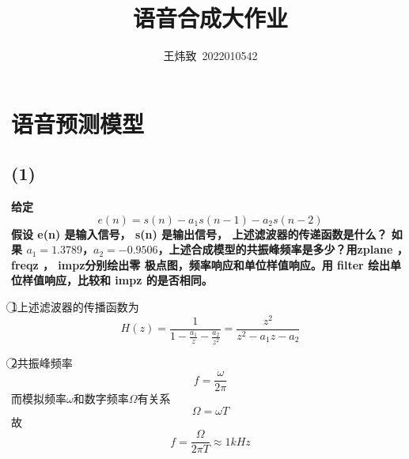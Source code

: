 \documentclass[10pt]{article}
\title{语音合成大作业}
\author{王炜致\ 2022010542}
\date{}
\begin{document}
\maketitle
\section{语音预测模型}
\subsection*{(1)}
\textbf{
给定$$e(n) = s(n) - a_1s(n - 1) - a_2s(n - 2)$$
假设 e(n) 是输入信号， s(n) 是输出信号， 上述滤波器的传递函数是什么？ 如果 $a_1 = 1.3789
$，$a_2 = -0.9506$，上述合成模型的共振峰频率是多少？用zplane ， freqz ， impz分别绘出零
极点图，频率响应和单位样值响应。用 filter 绘出单位样值响应，比较和 impz 的是否相同。}

\textcircled{1}上述滤波器的传播函数为$$H(z)=\frac{1}{1-\frac{a_1}{z}-\frac{a_2}{z^2}} 
=\frac{z^2}{z^2-a_1z-a_2}$$

\textcircled{2}共振峰频率$$f=\frac{\omega}{2\pi}$$
而模拟频率$\omega$和数字频率$\Omega$有关系$$\Omega=\omega T$$
故$$f=\frac{\Omega}{2\pi T}\approx1kHz$$
\end{document}
